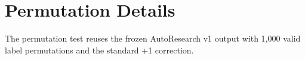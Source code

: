 \section{Permutation Details}
The permutation test reuses the frozen AutoResearch v1 output with 1,000 valid label permutations and the standard +1 correction.
